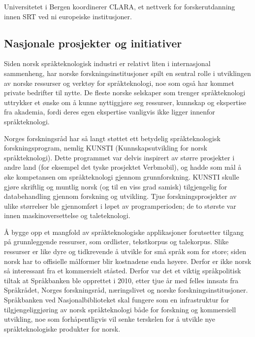 \begin{multicols}{2}
Universitetet i Bergen koordinerer CLARA, et nettverk for forskerutdanning innen SRT ved ni europeiske institusjoner.

\subsection{Nasjonale prosjekter og initiativer}

Siden norsk språkteknologisk industri er relativt liten i internasjonal sammenheng, har norske forskningsinstitusjoner spilt en sentral rolle i utviklingen av norske ressurser og verktøy for språkteknologi, noe som også har kommet private bedrifter til nytte. 
De fleste norske selskaper som trenger språkteknologi uttrykker et ønske om å kunne nyttiggjøre seg ressurser, kunnskap og ekspertise fra akademia, fordi deres egen ekspertise vanligvis ikke ligger innenfor språkteknologi. 

Norges forskningsråd har så langt støttet ett betydelig språkteknologisk forskningsprogram, nemlig KUNSTI (Kunnskapsutvikling for norsk språkteknologi). 
Dette programmet var delvis inspirert av større prosjekter i andre land (for eksempel det tyske prosjektet Verbmobil), og hadde som mål å øke kompetansen om språkteknologi gjennom grunnforskning. KUNSTI skulle gjøre skriftlig og muntlig norsk (og til en viss grad samisk) tilgjengelig for databehandling gjennom forskning og utvikling. Tjue forskningsprosjekter av ulike størrelser ble gjennomført i løpet av programperioden; de to største var innen maskinoversettelse og taleteknologi.


Å bygge opp et mangfold av språkteknologiske applikasjoner forutsetter tilgang på grunnleggende ressurser, som ordlister, tekstkorpus og talekorpus. Slike ressurser er like dyre og tidkrevende å utvikle for små språk som for store; siden norsk har to offisielle målformer blir kostnadene enda høyere. 
Derfor er ikke norsk så interessant fra et kommersielt ståsted. Derfor var det et viktig språkpolitisk tiltak at Språkbanken ble opprettet i 2010, etter tjue år med felles innsats fra Språkrådet, Norges forskningsråd, næringslivet og norske forskningsinstitusjoner. Språkbanken ved Nasjonalbiblioteket skal fungere som en infrastruktur for tilgjengeliggjøring av norsk språkteknologi både for forskning og kommersiell utvikling, noe som forhåpentligvis vil senke terskelen for å utvikle nye språkteknologiske produkter for norsk. 


\end{multicols}
